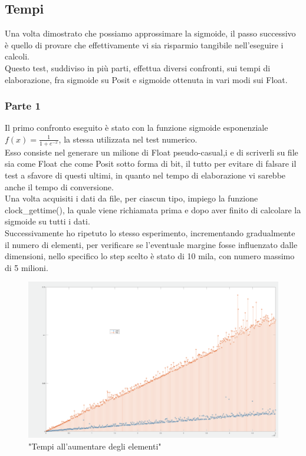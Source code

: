 \documentclass[a4paper,11pt]{article}
\begin{document}
\subsection{Tempi}

Una volta dimostrato che possiamo approssimare la sigmoide, il passo successivo è quello di provare che effettivamente vi sia risparmio tangibile nell'eseguire i calcoli. \\
Questo test, suddiviso in più parti, effettua diversi confronti, sui tempi di elaborazione, fra sigmoide su Posit e sigmoide ottenuta in vari modi sui Float.

\subsubsection{Parte 1}

Il primo confronto eseguito è stato con la funzione sigmoide esponenziale  $ f(x) = \frac {1}{1 + e^{-x}} $, la stessa utilizzata nel test numerico.\\
Esso consiste nel generare un milione di Float pseudo-casual,i e di scriverli su file sia come Float che come Posit sotto forma di bit, il tutto per evitare di falsare il test a sfavore di questi ultimi, in quanto nel tempo di elaborazione vi sarebbe anche il tempo di conversione. \\
Una volta acquisiti i dati da file, per ciascun tipo, impiego la funzione clock\_gettime(), la quale viene richiamata prima e dopo aver finito di calcolare la sigmoide su tutti i dati.\\
Successivamente ho ripetuto lo stesso esperimento, incrementando gradualmente il numero di elementi, per verificare se l'eventuale margine fosse influenzato dalle dimensioni, nello specifico lo step scelto è stato di 10 mila, con numero massimo di 5 milioni.

\begin{figure}[h]
	\includegraphics[scale=0.15]{tempi}
	\centering
	\caption{"Tempi all'aumentare degli elementi"}
\end{figure}
\end{document}
